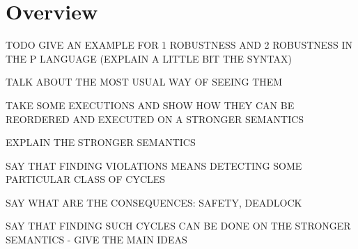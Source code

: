 \section{Overview}

TODO GIVE AN EXAMPLE FOR 1 ROBUSTNESS AND 2 ROBUSTNESS IN THE P LANGUAGE (EXPLAIN A LITTLE BIT THE SYNTAX)

TALK ABOUT THE MOST USUAL WAY OF SEEING THEM

TAKE SOME EXECUTIONS AND SHOW HOW THEY CAN BE REORDERED AND EXECUTED ON A STRONGER SEMANTICS

EXPLAIN THE STRONGER SEMANTICS

SAY THAT FINDING VIOLATIONS MEANS DETECTING SOME PARTICULAR CLASS OF CYCLES

SAY WHAT ARE THE CONSEQUENCES: SAFETY, DEADLOCK

SAY THAT FINDING SUCH CYCLES CAN BE DONE ON THE STRONGER SEMANTICS - GIVE THE MAIN IDEAS
